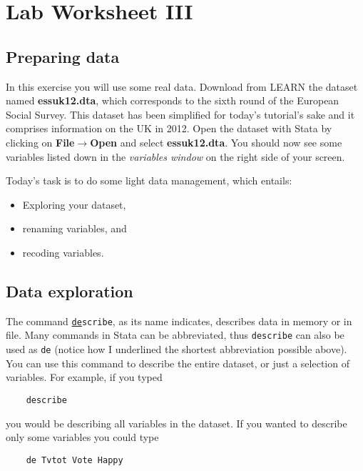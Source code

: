 \section{\hfil Lab Worksheet III \hfil}
\subsection*{Preparing data}
	
In this exercise you will use some real data. Download from LEARN the dataset named \textbf{essuk12.dta}, which corresponds to the sixth round of the European Social Survey. This dataset has been simplified for today's tutorial's sake and it comprises information on the UK in 2012. Open the dataset with Stata by clicking on \textbf{File$\to$Open} and select \textbf{essuk12.dta}. You should now see some variables listed down in the \textit{variables window} on the right side of your screen.

Today's task is to do some light data management, which entails:

\begin{itemize}
	\item Exploring your dataset,
	\item renaming variables, and
	\item recoding variables.
\end{itemize}

\subsection*{Data exploration}
The command \texttt{\underline{de}scribe}, as its name indicates, describes data in memory or in file. Many commands in Stata can be abbreviated, thus \texttt{describe} can also be used as \texttt{de} (notice how I underlined the shortest abbreviation possible above). You can use this command to describe the entire dataset, or just a selection of variables. For example, if you typed

\begin{lstlisting}
	describe
\end{lstlisting}

you would be describing all variables in the dataset. If you wanted to describe only some variables you could type

\begin{lstlisting}
	de Tvtot Vote Happy
\end{lstlisting}

